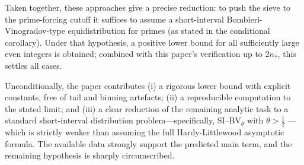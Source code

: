 \documentclass[11pt]{article}
\theoremstyle{inline}
\theoremstyle{break}
\theoremstyle{break}
\theoremstyle{break}
\theoremstyle{break}
\theoremstyle{break}
\theoremstyle{break}
\theoremstyle{break}
\theoremstyle{inline}
\newcommand{\nprodstar}{n_{\ast}}  %
\begin{document}
Taken together, these approaches give a precise reduction: to push the sieve to the prime-forcing cutoff it suffices to assume a short-interval Bombieri-Vinogradov-type equidistribution for primes (as stated in the conditional corollary). Under that hypothesis, a positive lower bound for all sufficiently large even integers is obtained; combined with this paper's verification up to \(2\nprodstar\), this settles all cases.

Unconditionally, the paper contributes (i) a rigorous lower bound with explicit constants, free of tail and binning artefacts; (ii) a reproducible computation to the stated limit; and (iii) a clear reduction of the remaining analytic task to a standard short-interval distribution problem—specifically, SI--BV\(_\theta\) with \( \theta > \tfrac12 \) —which is strictly weaker than assuming the full Hardy-Littlewood asymptotic formula.
The available data strongly support the predicted main term, and the remaining hypothesis is sharply circumscribed.
\end{document}
